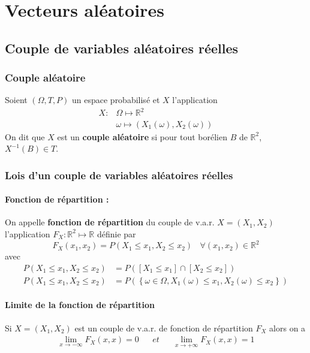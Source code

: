 \documentclass[10pt,a4paper,twoside]{article}
\begin{document}
\section{Vecteurs aléatoires}
\subsection{Couple de variables aléatoires réelles}
\subsubsection{Couple aléatoire}
Soient $(\Omega,T,P)$ un espace probabilisé et $X$ l'application
\begin{align*}
X :& \Omega \longmapsto \mathbb{R}^{2}\\
 & \omega \longmapsto (X_{1}(\omega),X_{2}(\omega))
\end{align*}
On dit que $X$ est un \textbf{couple aléatoire} si pour tout borélien $B$ de $\mathbb{R}^{2}$, $X^{-1}(B)\in T$.

\subsubsection{Lois d'un couple de variables aléatoires réelles}
\paragraph{Fonction de répartition :} On appelle \textbf{fonction de répartition} du couple de v.a.r. $X=(X_{1},X_{2})$ l'application $F_{X}:\mathbb{R}^{2}\mapsto \mathbb{R}$ définie par 
$$F_{X}(x_{1},x_{2}) = P(X_{1}\leqslant x_{1}, X_{2}\leqslant x_{2})\ \ \ \ \forall (x_{1},x_{2})\in \mathbb{R}^{2}$$
avec
\begin{align*}
P\left(X_{1}\leqslant x_{1},X_{2}\leqslant x_{2}\right) &= P\left(\left[X_{1}\leqslant x_{1}\right]\cap \left[X_{2}\leqslant x_{2}\right]\right)\\
P\left(X_{1}\leqslant x_{1},X_{2}\leqslant x_{2}\right) &= P\left(\left\lbrace\omega \in \Omega, X_{1}(\omega) \leqslant x_{1}, X_{2}(\omega)\leqslant x_{2}\right\rbrace\right)
\end{align*}

\paragraph{Limite de la fonction de répartition} Si $X=(X_{1},X_{2})$ est un couple de v.a.r. de fonction de répartition $F_{X}$ alors on a 
\begin{align*}
\lim\limits_{x\rightarrow -\infty} F_{X}(x,x) = 0 &&et&&  \lim\limits_{x\rightarrow +\infty} F_{X}(x,x) = 1 
\end{align*}
\end{document}
